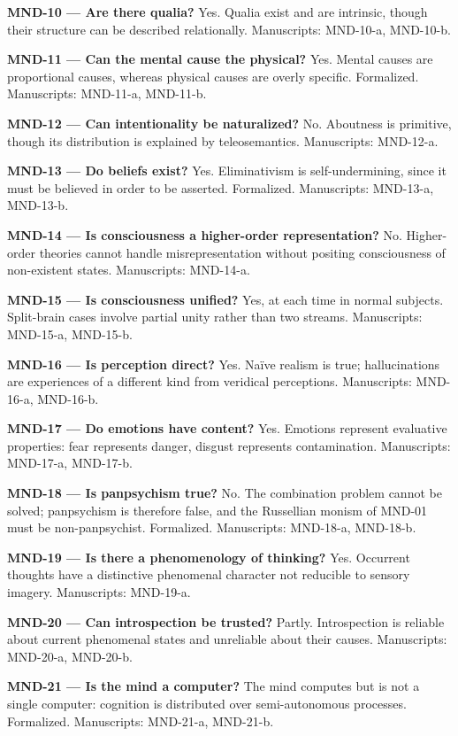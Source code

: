 \documentclass[10pt]{article}
\begin{document}
\textbf{MND-10 --- Are there qualia?} Yes. Qualia exist and are intrinsic, though their structure can be described relationally. Manuscripts: MND-10-a, MND-10-b.

\textbf{MND-11 --- Can the mental cause the physical?} Yes. Mental causes are proportional causes, whereas physical causes are overly specific. Formalized. Manuscripts: MND-11-a, MND-11-b.

\textbf{MND-12 --- Can intentionality be naturalized?} No. Aboutness is primitive, though its distribution is explained by teleosemantics. Manuscripts: MND-12-a.

\textbf{MND-13 --- Do beliefs exist?} Yes. Eliminativism is self-undermining, since it must be believed in order to be asserted. Formalized. Manuscripts: MND-13-a, MND-13-b.

\textbf{MND-14 --- Is consciousness a higher-order representation?} No. Higher-order theories cannot handle misrepresentation without positing consciousness of non-existent states. Manuscripts: MND-14-a.

\textbf{MND-15 --- Is consciousness unified?} Yes, at each time in normal subjects. Split-brain cases involve partial unity rather than two streams. Manuscripts: MND-15-a, MND-15-b.

\textbf{MND-16 --- Is perception direct?} Yes. Naïve realism is true; hallucinations are experiences of a different kind from veridical perceptions. Manuscripts: MND-16-a, MND-16-b.

\textbf{MND-17 --- Do emotions have content?} Yes. Emotions represent evaluative properties: fear represents danger, disgust represents contamination. Manuscripts: MND-17-a, MND-17-b.

\textbf{MND-18 --- Is panpsychism true?} No. The combination problem cannot be solved; panpsychism is therefore false, and the Russellian monism of MND-01 must be non-panpsychist. Formalized. Manuscripts: MND-18-a, MND-18-b.

\textbf{MND-19 --- Is there a phenomenology of thinking?} Yes. Occurrent thoughts have a distinctive phenomenal character not reducible to sensory imagery. Manuscripts: MND-19-a.

\textbf{MND-20 --- Can introspection be trusted?} Partly. Introspection is reliable about current phenomenal states and unreliable about their causes. Manuscripts: MND-20-a, MND-20-b.

\textbf{MND-21 --- Is the mind a computer?} The mind computes but is not a single computer: cognition is distributed over semi-autonomous processes. Formalized. Manuscripts: MND-21-a, MND-21-b.
\end{document}
